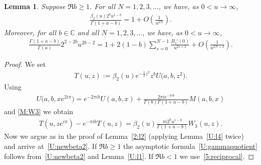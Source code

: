 \documentclass[pdftex]{sigma}
\newcommand{\C}{\mathbb{C}}
\numberwithin{equation}{section}
\newtheorem{Lemma}[Theorem]{Lemma}
{ \theoremstyle{definition}
\newtheorem{Remarks}[Theorem]{Remarks} }
\begin{document}
\begin{Lemma}\label{U:l5}
Suppose $\Re b\ge 1$.
For all $N=1,2,3,\dots$, we have, as $0<u\to\infty$,
\begin{gather}\label{U:newbeta2}
 \frac{\beta_2(u)2^bu^{1-b}}{\Gamma(1+a-b)}=1+O\left(\frac{1}{u^{2N}}\right).
\end{gather}
Moreover, for all $b\in\C$ and all $N=1,2,3,\dots$, we have, as $0<u\to\infty$,
\begin{gather}\label{U:gammaquotient}
 \frac{\Gamma(1+a-b)}{\Gamma(a)} 2^{2-2b}u^{2b-2}=1+2(1-b)\sum_{s=0}^{N-1} \frac{B_s'(0)}{u^{2s+2}}+O\left(\frac{1}{u^{2N+2}}\right) .
\end{gather}
\end{Lemma}
\begin{proof}
We set
\begin{gather*} T(u,z):=\beta_2(u)e^{-\frac12z^2}z^bU\big(a,b,z^2\big).\end{gather*}
Using \cite[(13.2.12)]{NIST}
\begin{gather*}%
U\big(a,b,xe^{2i\pi}\big)=e^{-2\pi i b}U(a,b,x)+\frac{2\pi i e^{-\pi i b}}{\Gamma(b)\Gamma(1+a-b)} M(a,b,x)
\end{gather*}
and \eqref{M:W3} we obtain
\begin{gather*}%
T(u,ze^{i\pi})-e^{-\pi i b}T(u,z)=\beta_2(u)\frac{\pi i 2^bu^{1-b}}{\Gamma(1+a-b)}W_3(u,z) .
\end{gather*}
Now we argue as in the proof of Lemma~\ref{2:l2} (applying Lemma~\ref{U:l4} twice) and arrive at~\eqref{U:newbeta2}.
If $\Re b\ge 1$ the asymptotic formula~\eqref{U:gammaquotient} follows from~\eqref{U:newbeta2} and Lemma~\ref{U:l1}. If $\Re b<1$ we use~\eqref{5:reciprocal}.
\end{proof}
\end{document}
